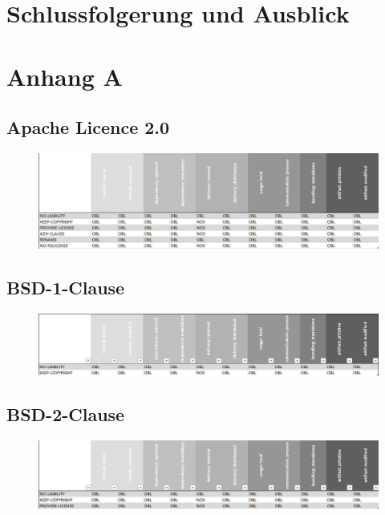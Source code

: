 \documentclass[12pt,titlepage]{report}
\begin{document}
\chapter{Schlussfolgerung und Ausblick}


\newpage
\vspace*{-1,6cm}
\listoffigures

\newpage
\vspace*{-1,6cm}
\listoftables

\newpage
{}
\printbibliography

\newpage
\chapter*{Anhang A}
\section*{Apache Licence 2.0}
\begin{figure}[h]
    \centering
    \includegraphics[scale=0.5]{Bilder/apache20.png}
\end{figure}

\section*{BSD-1-Clause}
\begin{figure}[h]
    \centering
    \includegraphics[scale=0.5]{Bilder/bsd1clause.png}
\end{figure}

\section*{BSD-2-Clause}
\begin{figure}[h]
    \centering
    \includegraphics[scale=0.5]{Bilder/bsd2clause.png}
\end{figure}
\end{document}
